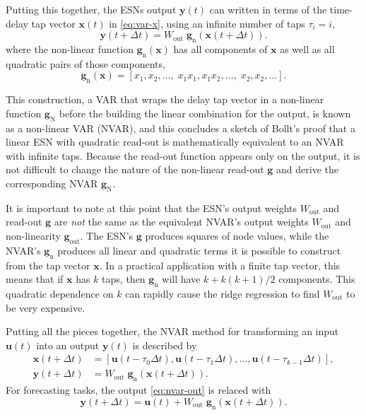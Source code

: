 Putting this together, the ESNs output $\bm{y}(t)$ can written in
terms of the time-delay tap vector $\bm{x}(t)$ in \cref{eq:var-x},
using an infinite number of taps $\tau_i = i$,
\begin{equation}
  \bm{y}(t + \Delta t) = W_\text{out}\;\bm{g}_\text{n}\left(\bm{x}(t + \Delta t)\right).
\end{equation}
where the non-linear function $\bm{g}_\text{n}(\bm{x})$ has all
components of $\bm{x}$ as well as all quadratic pairs of those components,
\begin{equation}
  \label{eq:quadratic-nvar}
  \bm{g}_\text{n}(\bm{x}) = [x_1, x_2, \dots, \; x_1 x_1, x_1 x_2, \dots, \; x_2, x_2, \dots].
\end{equation}

This construction, a VAR that wraps the delay tap vector in a
non-linear function $\bm{g}_\text{N}$ before the building the linear
combination for the output, is known as a non-linear VAR (NVAR), and
this concludes a sketch of Bollt's proof that a linear ESN with
quadratic read-out is mathematically equivalent to an NVAR with
infinite taps\cite{bollt2021}. Because the read-out function appears
only on the output, it is not difficult to change the nature of the
non-linear read-out $\bm{g}$ and derive the corresponding NVAR
$\bm{g}_\text{N}$.

It is important to note at this point that the ESN's output weights
$W_\text{out}$ and read-out $\bm{g}$ are \emph{not} the same as the
equivalent NVAR's output weights $W_\text{out}$ and non-linearity
$\bm{g}_\text{out}$. The ESN's $\bm{g}$ produces squares of node
values, while the NVAR's $\bm{g}_\text{n}$ produces all linear and
quadratic terms it is possible to construct from the tap vector
$\bm{x}$. In a practical application with a finite tap vector, this
means that if $\bm{x}$ has $k$ taps, then $\bm{g}_\text{n}$ will have
$k + k(k+1)/2$ components. This quadratic dependence on $k$ can
rapidly cause the ridge regression to find $W_\text{out}$ to be very
expensive.

Putting all the pieces together, the NVAR method for transforming an
input $\bm{u}(t)$ into an output $\bm{y}(t)$ is described by
\begin{align}
  \label{eq:nvar}
  \bm{x}(t + \Delta t) &= [\bm{u}(t - \tau_0 \Delta t), \bm{u}(t - \tau_1 \Delta t), \dots, \bm{u}(t - \tau_{k-1} \Delta t)], \\
  \label{eq:nvar-out}
  \bm{y}(t + \Delta t) &= W_\text{out}\;\bm{g}_\text{n}\left(\bm{x}(t + \Delta t)\right).
\end{align}
For forecasting tasks, the output \cref{eq:nvar-out} is relaced with
\begin{equation}
  \label{eq:nvar-out-forecast}
  \bm{y}(t + \Delta t) = \bm{u}(t) + W_\text{out}\;\bm{g}_\text{n}\left(\bm{x}(t + \Delta t)\right).
\end{equation}

